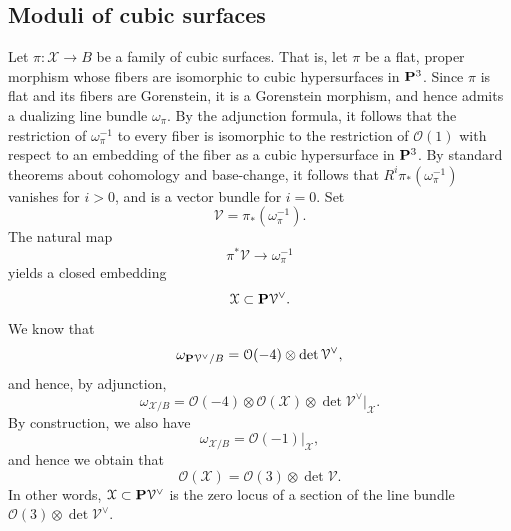\documentclass[12pt,reqno]{amsart}
\renewcommand{\to}{{\longrightarrow}}
\numberwithin{equation}{section}
\renewcommand{\O}{\mathcal O}
\newcommand{\cX}{\mathcal{X}}
\begin{document}
\subsection{Moduli of cubic surfaces}
\label{sec:classical-facts}
Let $\pi \colon \cX \to B$ be a family of cubic surfaces.  That is,
let $\pi$ be a flat, proper morphism whose fibers are isomorphic to
cubic hypersurfaces in $\P^3$.  Since $\pi$ is flat and its fibers are
Gorenstein, it is a Gorenstein morphism, and hence admits a dualizing
line bundle $\omega_\pi$.  By the adjunction formula, it follows that
the restriction of $\omega_{\pi}^{-1}$ to every fiber is isomorphic to
the restriction of $\O(1)$ with respect to an embedding of the fiber
as a cubic hypersurface in $\P^3$.  By standard theorems about
cohomology and base-change, it follows that
$R^i\pi_* \left(\omega_{\pi}^{-1}\right)$ vanishes for $i > 0$, and is
a vector bundle for $i = 0$.  Set
\[ \mathcal V = \pi_* \left( \omega_\pi^{-1} \right).\]
The natural map 
\[ \pi^*\mathcal V \to \omega_{\pi}^{-1}\]
yields a closed embedding
\begin{equation}\label{eqn:relcanx}
  \cX \subset \P \mathcal V^\vee.
\end{equation}
We know that
\[ \omega_{\P \mathcal V^\vee/B} = \O(-4) \otimes \det \mathcal V^\vee,\]
and hence, by adjunction,
\[ \omega_{\cX/B}= \O(-4) \otimes \O(\cX) \otimes \det \mathcal V^\vee |_\cX.\]
By construction, we also have
\[ \omega_{\cX/B} = \O(-1)|_\cX,\]
and hence we obtain that
\begin{equation}\label{eqn:ox}
  \O(\cX) = \O(3) \otimes \det \mathcal V.
\end{equation}
In other words, $\cX \subset \P \mathcal V^\vee$ is the zero locus of
a section of the line bundle $\O(3) \otimes \det \mathcal V^\vee$.
\end{document}
